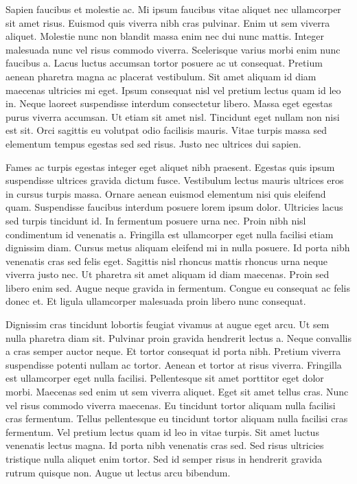 \documentclass[11pt,a4paper]{article}
\begin{document}
Sapien faucibus et molestie ac. Mi ipsum faucibus vitae aliquet nec ullamcorper sit amet risus. Euismod quis viverra nibh cras pulvinar. Enim ut sem viverra aliquet. Molestie nunc non blandit massa enim nec dui nunc mattis. Integer malesuada nunc vel risus commodo viverra. Scelerisque varius morbi enim nunc faucibus a. Lacus luctus accumsan tortor posuere ac ut consequat. Pretium aenean pharetra magna ac placerat vestibulum. Sit amet aliquam id diam maecenas ultricies mi eget. Ipsum consequat nisl vel pretium lectus quam id leo in. Neque laoreet suspendisse interdum consectetur libero. Massa eget egestas purus viverra accumsan. Ut etiam sit amet nisl. Tincidunt eget nullam non nisi est sit. Orci sagittis eu volutpat odio facilisis mauris. Vitae turpis massa sed elementum tempus egestas sed sed risus. Justo nec ultrices dui sapien.

Fames ac turpis egestas integer eget aliquet nibh praesent. Egestas quis ipsum suspendisse ultrices gravida dictum fusce. Vestibulum lectus mauris ultrices eros in cursus turpis massa. Ornare aenean euismod elementum nisi quis eleifend quam. Suspendisse faucibus interdum posuere lorem ipsum dolor. Ultricies lacus sed turpis tincidunt id. In fermentum posuere urna nec. Proin nibh nisl condimentum id venenatis a. Fringilla est ullamcorper eget nulla facilisi etiam dignissim diam. Cursus metus aliquam eleifend mi in nulla posuere. Id porta nibh venenatis cras sed felis eget. Sagittis nisl rhoncus mattis rhoncus urna neque viverra justo nec. Ut pharetra sit amet aliquam id diam maecenas. Proin sed libero enim sed. Augue neque gravida in fermentum. Congue eu consequat ac felis donec et. Et ligula ullamcorper malesuada proin libero nunc consequat.

Dignissim cras tincidunt lobortis feugiat vivamus at augue eget arcu. Ut sem nulla pharetra diam sit. Pulvinar proin gravida hendrerit lectus a. Neque convallis a cras semper auctor neque. Et tortor consequat id porta nibh. Pretium viverra suspendisse potenti nullam ac tortor. Aenean et tortor at risus viverra. Fringilla est ullamcorper eget nulla facilisi. Pellentesque sit amet porttitor eget dolor morbi. Maecenas sed enim ut sem viverra aliquet. Eget sit amet tellus cras. Nunc vel risus commodo viverra maecenas. Eu tincidunt tortor aliquam nulla facilisi cras fermentum. Tellus pellentesque eu tincidunt tortor aliquam nulla facilisi cras fermentum. Vel pretium lectus quam id leo in vitae turpis. Sit amet luctus venenatis lectus magna. Id porta nibh venenatis cras sed. Sed risus ultricies tristique nulla aliquet enim tortor. Sed id semper risus in hendrerit gravida rutrum quisque non. Augue ut lectus arcu bibendum.
\end{document}
